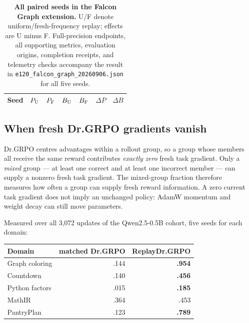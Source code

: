 \documentclass{article}
\newcommand{\1}{\mathbf 1}
\theoremstyle{remark}
\theoremstyle{definition}
\theoremstyle{plain}
\begin{document}
\begin{table}[H]
  \centering
  \caption{\textbf{All paired seeds in the Falcon Graph extension.}
  U/F denote uniform/fresh-frequency replay; effects are U minus F.
  Full-precision endpoints, all supporting metrics, evaluation origins,
  completion receipts, and telemetry checks accompany the result in
  \texttt{e120\_falcon\_graph\_20260906.json} for all five seeds.}
  \label{tab:e120-falcon-graph-seeds}
  \small
  \setlength{\tabcolsep}{4pt}
  \begin{tabular}{@{}rrrrrrr@{}}
    \toprule
    \textbf{Seed} & $P_{\rm U}$ & $P_{\rm F}$ & $B_{\rm U}$
      & $B_{\rm F}$ & $\Delta P$ & $\Delta B$ \\
    \midrule
    
  \end{tabular}
\end{table}

\subsection{When fresh Dr.GRPO gradients vanish}
\label{app:degenerate-groups}

Dr.GRPO centres advantages within a rollout group, so a group whose members all
receive the same reward contributes \emph{exactly zero} fresh task gradient.
Only a \emph{mixed} group --- at least one correct and at least one incorrect
member --- can supply a nonzero fresh task gradient. The mixed-group fraction
therefore measures how often a group can supply fresh reward information.
A zero current task gradient does not imply an unchanged policy: AdamW momentum
and weight decay can still move parameters.

Measured over all 3{,}072 updates of the Qwen2.5-0.5B cohort, five seeds
for each domain:

\begin{center}
\small
\begin{tabular}{@{}lrr@{}}
\toprule
\textbf{Domain} & \textbf{matched Dr.GRPO} & \textbf{ReplayDr.GRPO} \\
\midrule
Graph coloring & .144 & \textbf{.954} \\
Countdown      & .140 & \textbf{.456} \\
Python factors & .015 & \textbf{.185} \\
MathIR         & .364 & .453 \\
PantryPlan     & .123 & \textbf{.789} \\
\bottomrule
\end{tabular}
\end{center}
\end{document}
